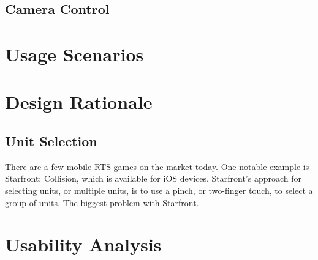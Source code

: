 \documentclass[11pt]{article}
\begin{document}
	\subsection{Camera Control}
\section{Usage Scenarios}
\section{Design Rationale}
	\subsection{Unit Selection}
	There are a few mobile RTS games on the market today. One notable example is Starfront: Collision, which is available for iOS devices. Starfront's approach for selecting units, or multiple units, is to use a pinch, or two-finger touch, to select a group of units. The biggest problem with Starfront.
\section{Usability Analysis}
\end{document}
